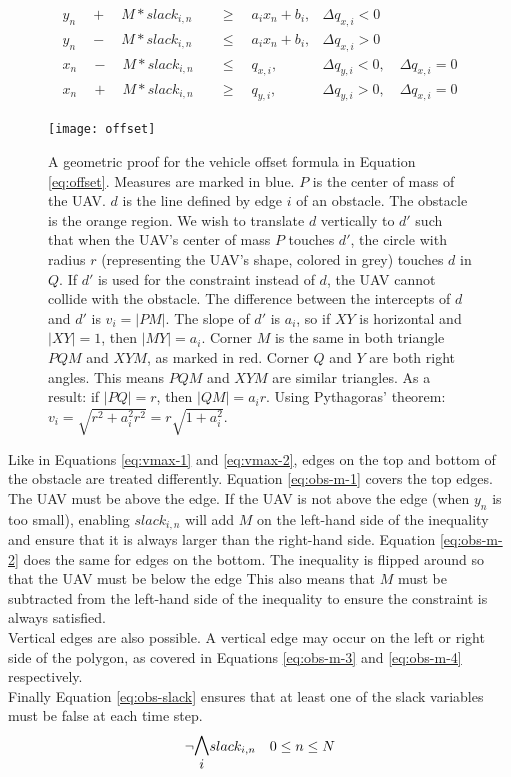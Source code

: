 \begin{align}
y_{n} \quad + \quad M*slack_{i,n} \quad &\geq 
\quad a_{i} x_{n} + b_{i},  	
& \Delta q_{x,i} < 0 							 	
\label{eq:obs-m-1} \\
y_{n} \quad - \quad M*slack_{i,n} \quad &\leq 
\quad a_{i} x_{n} + b_{i},
& \Delta q_{x,i} > 0 							 	
\label{eq:obs-m-2} \\
x_{n} \quad - \quad M*slack_{i,n} \quad &\leq
\quad  q_{x,i}, 		
& \Delta q_{y,i} < 0, \quad \Delta q_{x,i} = 0 	
\label{eq:obs-m-3} \\
x_{n} \quad + \quad M*slack_{i,n} \quad &\geq 
\quad q_{y,i},  		
& \Delta q_{y,i} > 0, \quad \Delta q_{x,i} = 0 	
\label{eq:obs-m-4}
\end{align}
\begin{figure}
    \centering
        \texttt{[image: offset]}
    \caption{A geometric proof for the vehicle offset formula in Equation \ref{eq:offset}. Measures are marked in blue. $P$ is the center of mass of the UAV. $d$ is the line defined by edge $i$ of an obstacle. The obstacle is the orange region. We wish to translate $d$ vertically to $d'$ such that when the UAV's center of mass $P$ touches $d'$, the circle with radius $r$ (representing the UAV's shape, colored in grey) touches $d$ in $Q$. If $d'$ is used for the constraint instead of $d$, the UAV cannot collide with the obstacle. The difference between the intercepts of $d$ and $d'$ is $v_i = |PM|$. The slope of $d'$ is $a_i$, so if $XY$ is horizontal and $|XY| = 1$, then $|MY| = a_i$. Corner $M$ is the same in both triangle $PQM$ and $XYM$, as marked in red. Corner $Q$ and $Y$ are both right angles. This means $PQM$ and $XYM$ are similar triangles. As a result: if $|PQ| = r$, then $|QM| = a_ir$. Using Pythagoras' theorem: $v_i = \sqrt{r^2 + a_i^2r^2} = r\sqrt{1+a_i^2}$.}\label{fig:offset-proof}
\end{figure}
Like in Equations \ref{eq:vmax-1} and \ref{eq:vmax-2}, edges on the top and bottom of the obstacle are treated differently. Equation \ref{eq:obs-m-1} covers the top edges. The UAV must be above the edge. If the UAV is not above the edge (when $y_n$ is too small), enabling $slack_{i,n}$ will add $M$ on the left-hand side of the inequality and ensure that it is always larger than the right-hand side. Equation \ref{eq:obs-m-2} does the same for edges on the bottom. The inequality is flipped around so that the UAV must be below the edge This also means that $M$ must be subtracted from the left-hand side of the inequality to ensure the constraint is always satisfied. \\
Vertical edges are also possible. A vertical edge may occur on the left or right side of the polygon, as covered in Equations \ref{eq:obs-m-3} and \ref{eq:obs-m-4} respectively.\\
Finally Equation \ref{eq:obs-slack} ensures that at least one of the slack variables must be false at each time step.
\begin{equation}
\neg \mathlarger{\mathlarger{\bigwedge_{i}}} slack_{i,n} \quad 0 \leq n \leq N
\label{eq:obs-slack}
\end{equation}

